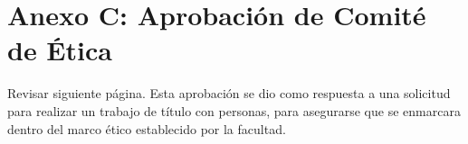 \chapter*{Anexo C: Aprobación de Comité de Ética}\label{AnexoC}

Revisar siguiente página. Esta aprobación se dio como respuesta a una solicitud para realizar un trabajo de título con personas, para asegurarse que se enmarcara dentro del marco ético establecido por la facultad.


\begin{figure}[h]
   \centering
\end{figure}

